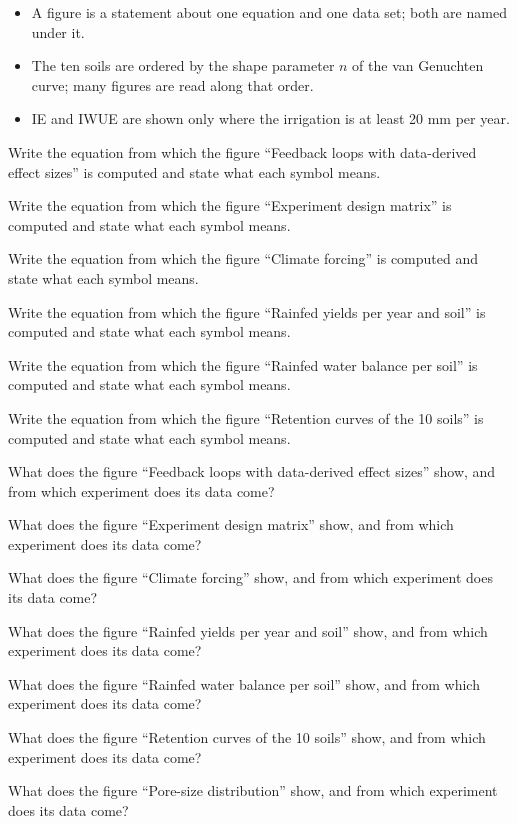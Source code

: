 \begin{itemize}
\item A figure is a statement about one equation and one data set; both are named under it.
\item The ten soils are ordered by the shape parameter $n$ of the van Genuchten curve; many figures are read along that order.
\item IE and IWUE are shown only where the irrigation is at least 20 mm per year.
\end{itemize}
\begin{exlist}
\item Write the equation from which the figure ``Feedback loops with data-derived effect sizes'' is computed and state what each symbol means. 
\item Write the equation from which the figure ``Experiment design matrix'' is computed and state what each symbol means. 
\item Write the equation from which the figure ``Climate forcing'' is computed and state what each symbol means. 
\item Write the equation from which the figure ``Rainfed yields per year and soil'' is computed and state what each symbol means. 
\item Write the equation from which the figure ``Rainfed water balance per soil'' is computed and state what each symbol means. 
\item Write the equation from which the figure ``Retention curves of the 10 soils'' is computed and state what each symbol means. 
\end{exlist}
\begin{exlist}
\item What does the figure ``Feedback loops with data-derived effect sizes'' show, and from which experiment does its data come?
\item What does the figure ``Experiment design matrix'' show, and from which experiment does its data come?
\item What does the figure ``Climate forcing'' show, and from which experiment does its data come?
\item What does the figure ``Rainfed yields per year and soil'' show, and from which experiment does its data come?
\item What does the figure ``Rainfed water balance per soil'' show, and from which experiment does its data come?
\item What does the figure ``Retention curves of the 10 soils'' show, and from which experiment does its data come?
\item What does the figure ``Pore-size distribution'' show, and from which experiment does its data come?
\end{exlist}
